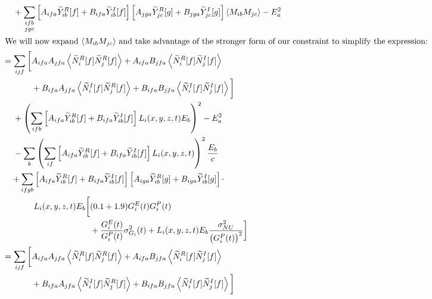 \begin{align*}
&\quad + \sum_{\substack{ifb\\jgc}} \left[A_{ifa} \widetilde{Y}_{ib}^R[f] + B_{ifa} \widetilde{Y}_{ib}^I[f]\right]\left[A_{jga} \widetilde{Y}_{jc}^R[g] + B_{jga} \widetilde{Y}_{jc}^I[g]\right] \left<M_{ib}M_{jc}\right> - E^2_a \\
%
\intertext{We will now expand $\left<M_{ib}M_{jc}\right>$ and take advantage of the stronger form of our constraint to simplify the expression:}
%
& \begin{aligned}
  = \sum_{ijf} \bigg[ & A_{ifa}A_{jfa} \left<\widetilde{N}_i^R[f]\widetilde{N}_j^R[f]\right> + A_{ifa}B_{jfa} \left<\widetilde{N}_i^R[f]\widetilde{N}_j^I[f]\right> \\
  & + B_{ifa}A_{jfa} \left<\widetilde{N}_i^I[f]\widetilde{N}_j^R[f]\right> + B_{ifa}B_{jfa} \left<\widetilde{N}_i^I[f]\widetilde{N}_j^I[f]\right>\bigg] \end{aligned} \\
&\quad + \left( \sum_{ifb} \left[A_{ifa} \widetilde{Y}_{ib}^R[f] + B_{ifa} \widetilde{Y}_{ib}^I[f]\right] L_i(x,y,z,t) E_b \right)^2 - E^2_a \\
&\quad - \sum_b \left( \sum_{if} \left[A_{ifa} \widetilde{Y}_{ib}^R[f] + B_{ifa} \widetilde{Y}_{ib}^I[f]\right] L_i(x,y,z,t) \right)^2 \frac{E_b}{c} \\
&\quad \begin{aligned}
  + \sum_{ifgb} &\left[A_{ifa} \widetilde{Y}_{ib}^R[f] + B_{ifa} \widetilde{Y}_{ib}^I[f]\right]\left[A_{iga} \widetilde{Y}_{ib}^R[g] + B_{iga} \widetilde{Y}_{ib}^I[g]\right] \cdot \\
  & \begin{aligned}
    L_i(x,y,z,t) E_b \bigg[ &(0.1 + 1.9) G^E_i(t) G^P_i(t) \\
    & + \frac{G^E_i(t)}{G^P_i(t)} \sigma^2_{G_i}(t) + L_i(x,y,z,t) E_b \frac{\sigma^2_{NU}}{\left(G^P_i(t)\right)^2} \bigg]
\end{aligned} \end{aligned} \\
%
& \begin{aligned}
  = \sum_{ijf} \bigg[ & A_{ifa}A_{jfa} \left<\widetilde{N}_i^R[f]\widetilde{N}_j^R[f]\right> + A_{ifa}B_{jfa} \left<\widetilde{N}_i^R[f]\widetilde{N}_j^I[f]\right> \\
  & + B_{ifa}A_{jfa} \left<\widetilde{N}_i^I[f]\widetilde{N}_j^R[f]\right> + B_{ifa}B_{jfa} \left<\widetilde{N}_i^I[f]\widetilde{N}_j^I[f]\right>\bigg] \end{aligned} \\
&\quad \begin{aligned}

\end{aligned}
\end{align*}
